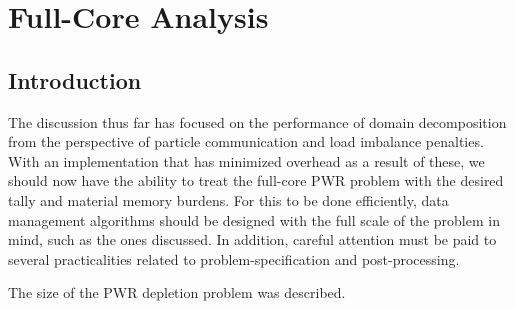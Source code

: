 \chapter{Full-Core Analysis}
\label{chap:full_core}

\section{Introduction}

The discussion thus far has focused on the performance of domain decomposition
from the perspective of particle communication and load imbalance penalties.
With an implementation that has minimized overhead as a result of these, we
should now have the ability to treat the full-core PWR problem with the desired
tally and material memory burdens. For this to be done efficiently, data
management algorithms should be designed with the full scale of the problem in
mind, such as the ones discussed. In
addition, careful attention must be paid to several practicalities related to
problem-specification and post-processing.

The size of the \ac{PWR} depletion problem was described.